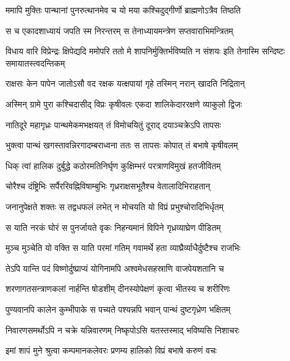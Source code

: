 \twolineshloka
{ममापि मुक्तिः पान्थानां पुनरुत्थानमेव च}
{यो मया कश्चिदुद्गीर्णो ब्राह्मणोऽत्रैव तिष्ठति} %

\twolineshloka
{स च एकादशाध्यायं जपति स्म निरन्तरम्}
{स तेनाध्यायमन्त्रेण सप्तवाराभिमन्त्रितम्} %

\threelineshloka
{विधाय वारि विप्रेन्द्रः क्षिपेद्यदि ममोपरि}
{ततो मे शापनिर्मुक्तिर्भविष्यति न संशयः}
{इति तेनास्मि सन्दिष्टः समायातस्त्वदन्तिकम्} %


\twolineshloka
{राक्षसः केन पापेन जातोऽसौ वद रक्षक}
{यत्क्षपायां गृहे तस्मिन् नरान् खादति निद्रितान्} %


\twolineshloka
{अस्मिन् ग्रामे पुरा कश्चिदासीद् विप्रः कृषीवलः}
{एकदा शालिकेदाररक्षणे व्याकुलो द्विजः} %

\twolineshloka
{नातिदूरे महागृध्रः पान्थमेकमभक्षयत्}
{तं विमोचयितुं दूराद् दयाञ्चक्रेऽपि तापसः} %

\twolineshloka
{भुक्त्वा पान्थं खगस्तावन्निरगादम्बराध्वना}
{ततः स तापसः कोपात् तं बभाषे कृषीवलम्} %

\twolineshloka
{धिक् त्वां हालिक दुर्बुद्धे कठोरमतिनिर्घृण}
{कुक्षिम्भरं परत्राणविमुखं हतजीवितम्} %

\twolineshloka
{चोरैश्च दंष्ट्रिभिः सर्पैररिवह्निविषाम्बुभिः}
{गृध्रराक्षसभूतैश्च वेतालादिभिराहतान्} %

\twolineshloka
{जनानुपेक्षते शक्तः स तद्वधफलं लभेत्}
{न मोचयति यो विप्रं प्रभुश्चोरादिभिर्धृतम्} %

\twolineshloka
{स याति नरकं घोरं स पुनर्जायते वृकः}
{निहन्यमानं विपिने गृध्रव्याघ्रेण पीडितम्} %

\twolineshloka
{मुञ्च मुञ्चेति यो वक्ति स याति परमां गतिम्}
{गवामर्थे हता व्याघ्रैर्व्याधैर्दुष्टैश्च राजभिः} %

\twolineshloka
{तेऽपि यान्ति पदं विष्णोर्दुष्प्राप्यं योगिनामपि}
{अश्वमेधसहस्राणि वाजपेयशतानि च} %

\twolineshloka
{शरणागतसन्त्राणकलां नार्हन्ति षोडशीम्}
{दीनस्योपेक्षणं कृत्वा भीतस्य च शरीरिणः} %

\twolineshloka
{पुण्यवानपि कालेन कुम्भीपाके स पच्यते}
{पश्यन्नपि भवान् पान्थं दुष्टगृध्रेण भक्षितम्} %

\twolineshloka
{निवारणसमर्थोऽपि न चक्रे यन्निवारणम्}
{निष्कृपोऽसि यतस्तस्माद् भविष्यसि निशाचरः} %

\twolineshloka
{इमां शापं मुने श्रुत्वा कम्पमानकलेवरः}
{प्रणम्य हालिको विप्रं बभाषे करुणं वचः} %

